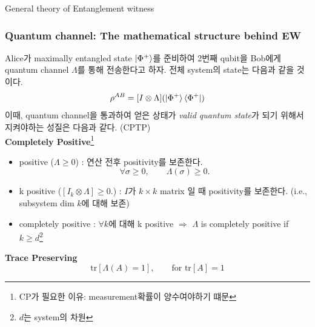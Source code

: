 \documentclass[9pt]{beamer}
\begin{document}
\begin{section}{General theory of  Entanglement witness}
        \begin{frame}
            \frametitle{Quantum channel: The mathematical structure behind EW}
            Alice가 maximally entangled state $\ket{\Phi^+}$를 준비하여 2번째 qubit을 Bob에게 quantum channel $\Lambda$를 통해 전송한다고 하자. 전체 system의 state는 다음과 같을 것이다.
            \begin{equation*}
                \rho^{AB} = [I \otimes \Lambda] (\ket{\Phi^+}\bra{\Phi^+})
            \end{equation*}
            이때, quantum channel을 통과하여 얻은 상태가 \textit{valid quantum state}가 되기 위해서 지켜야하는 성질은 다음과 같다. (CPTP)\\
            \vspace{0.2cm}
            \textbf{Completely Positive}\footnote{CP가 필요한 이유: measurement확률이 양수여야하기 떄문}
            \begin{itemize}
                \item positive ($\Lambda \ge 0$) : 연산 전후 positivity를 보존한다.
                \begin{equation*}
                    \forall \sigma \ge 0, \qquad \Lambda(\sigma) \ge 0.
                \end{equation*}
                \item k positive ($[I_k\otimes \Lambda]\ge 0.$) : $I$가 $k\times k$ matrix 일 때 positivity를 보존한다. (i.e., subsystem dim $k$에 대해 보존)
                \item \alert{completely positive} : $\forall k$에 대해 k positive
                $\Rightarrow$ $\Lambda$ is completely positive if $k \ge d$\footnote{$d$는 system의 차원}
            \end{itemize}
            \textbf{Trace Preserving}
            \begin{equation*}
                \text{tr} [\Lambda(A) = 1],\qquad \text{for }\text{tr}[A] = 1
            \end{equation*}
        \end{frame}


\end{section}
\end{document}

